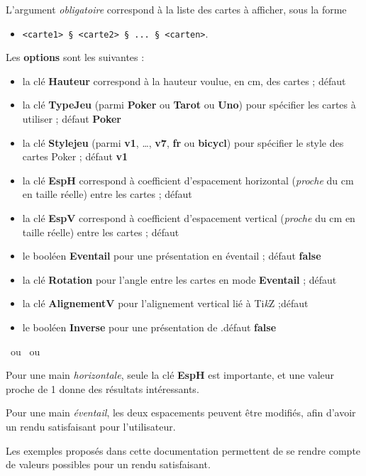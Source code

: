 \documentclass[a4paper]{article}
\providecommand\tikzlogo{Ti\textit{k}Z}
\let\TikZ\tikzlogo
\newcommand\cmaj[1]{\tcbox[vignetteMaJ]{#1}\xspace}
\newcommand\Cle[1]{{\bfseries\sffamily\textlangle #1\textrangle}}
\begin{document}
\begin{codecles}
L'argument \textit{obligatoire} correspond à la liste des cartes à afficher, sous la forme 

\begin{itemize}
	\item \texttt{<carte1> § <carte2> § ... § <carten>}.
\end{itemize}

Les \Cle{options} sont les suivantes :

\begin{itemize}
	\item la clé \Cle{Hauteur} correspond à la hauteur voulue, en cm, des cartes ; \hfill{}défaut \Cle{4.25}
	\item la clé \Cle{TypeJeu} (parmi \Cle{Poker} ou \Cle{Tarot} ou \Cle{Uno}) pour spécifier les cartes à utiliser ; \hfill{}défaut \Cle{Poker}
	\item \cmaj{0.3.5} la clé \Cle{Stylejeu} (parmi \Cle{v1}, \ldots, \Cle{v7}, \Cle{fr} ou \Cle{bicycl}) pour spécifier le style des cartes \textsf{Poker} ; \hfill{}défaut \Cle{v1}
	\item la clé \Cle{EspH} correspond à coefficient d'espacement horizontal (\textit{proche} du cm en taille réelle) entre les cartes ; \hfill{}défaut \Cle{1}
	\item la clé \Cle{EspV} correspond à coefficient d'espacement vertical (\textit{proche} du cm en taille réelle) entre les cartes ; \hfill{}défaut \Cle{0}
	\item le booléen \Cle{Eventail} pour une présentation en éventail ; \hfill{}défaut \Cle{false}
	\item la clé \Cle{Rotation} pour l'angle entre les cartes en mode \Cle{Eventail}  ; \hfill{}défaut \Cle{10}
	\item la clé \Cle{AlignementV} pour l'alignement vertical lié à \TikZ{} ;\hfill{}défaut \Cle{0.5}
	\item le booléen \Cle{Inverse} pour une présentation de .\hfill{}défaut \Cle{false}
\end{itemize}
\end{codecles}

\begin{codetex}[]
~ou 
~ou 
\end{codetex}

\begin{codeinfo}
Pour une main \textit{horizontale}, seule la clé \Cle{EspH} est importante, et une valeur proche de 1 donne des résultats intéressants.

\smallskip

Pour une main \textit{éventail}, les deux espacements peuvent être modifiés, afin d'avoir un rendu satisfaisant pour l'utilisateur.

\smallskip

Les exemples proposés dans cette documentation permettent de se rendre compte de valeurs possibles pour un rendu satisfaisant.
\end{codeinfo}
\end{document}
